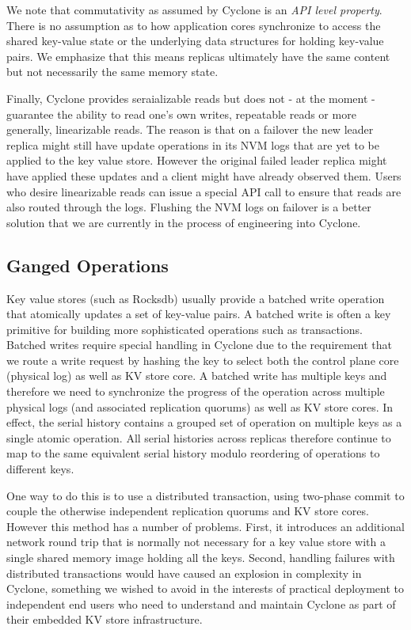 \documentclass[pageno]{jpaper}
\begin{document}
We note that commutativity as assumed by Cyclone is an \emph{API level
  property}. There is no assumption as to how application cores synchronize to
access the shared key-value state or the underlying data structures for holding
key-value pairs. We emphasize that this means replicas ultimately have the same
content but not necessarily the same memory state.

Finally, Cyclone provides seraializable reads but does not - at the moment -
guarantee the ability to read one's own writes, repeatable reads or more
generally, linearizable reads. The reason is that on a failover the new leader
replica might still have update operations in its NVM logs that are yet to be
applied to the key value store. However the original failed leader replica might
have applied these updates and a client might have already observed them. Users
who desire linearizable reads can issue a special API call to ensure that reads
are also routed through the logs. Flushing the NVM logs on failover is a better
solution that we are currently in the process of engineering into Cyclone.

\subsection{Ganged Operations}
Key value stores (such as Rocksdb) usually provide a batched write operation
that atomically updates a set of key-value pairs. A batched write is often a key
primitive for building more sophisticated operations such as
transactions. Batched writes require special handling in Cyclone due to the
requirement that we route a write request by hashing the key to select both the
control plane core (physical log) as well as KV store core. A batched write has
multiple keys and therefore we need to synchronize the progress of the operation
across multiple physical logs (and associated replication quorums) as well as KV
store cores. In effect, the serial history contains a grouped set of operation
on multiple keys as a single atomic operation. All serial histories across
replicas therefore continue to map to the same equivalent serial history modulo
reordering of operations to different keys.

One way to do this is to use a distributed transaction, using
two-phase commit to couple the otherwise independent replication quorums and KV
store cores. However this method has a number of problems. First, it introduces
an additional network round trip that is normally not necessary for a key value
store with a single shared memory image holding all the keys. Second, handling
failures with distributed transactions would have caused an explosion in
complexity in Cyclone, something we wished to avoid in the interests of
practical deployment to independent end users who need to understand and 
maintain Cyclone as part of their embedded KV store infrastructure.
\end{document}
